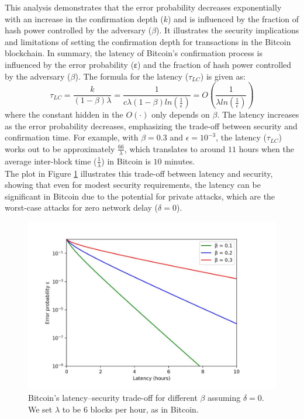 \documentclass{report}
\begin{document}
This analysis demonstrates that the error probability decreases exponentially with an increase in the confirmation depth ($k$) and is influenced by the fraction of hash power controlled by the adversary ($\beta$). It illustrates the security implications and limitations of setting the confirmation depth for transactions in the Bitcoin blockchain.
In summary, the latency of Bitcoin's confirmation process is influenced by the error probability (ε) and the fraction of hash power controlled by the adversary ($\beta$). The formula for the latency ($\tau_{LC}$) is given as:
\begin{equation*}
	\tau_{LC} = \frac{k}{(1 - \beta)\lambda } = \frac{1}{c \lambda (1 - \beta) ln(\frac{1}{\epsilon})} = O(\frac{1}{\lambda ln(\frac{1}{\epsilon})})
\end{equation*}
where the constant hidden in the $O(·)$ only depends on $\beta$. The latency increases as the error probability decreases, emphasizing the trade-off between security and confirmation time.
For example, with $\beta = 0.3$ and $\epsilon = 10^{-3}$, the latency ($\tau_{LC}$) works out to be approximately $\frac{66}{\lambda}$, which translates to around $11$ hours when the average inter-block time ($\frac{1}{\lambda}$) in Bitcoin is $10$ minutes.\\
The plot in Figure \ref{fig:f1} illustrates this trade-off between latency and security, showing that even for modest security requirements, the latency can be significant in Bitcoin due to the potential for private attacks, which are the worst-case attacks for zero network delay ($\delta = 0$).
\begin{center}
	\begin{figure}
		\centering
		\includegraphics[width=0.8\linewidth]{Fig/F1}
		\caption{Bitcoin’s latency–security trade-oﬀ for different $\beta$ assuming $\delta = 0$. We set $\lambda$ to be $6$ blocks per hour, as in Bitcoin.}
		\label{fig:f1}
	\end{figure}
\end{center}
\end{document}
